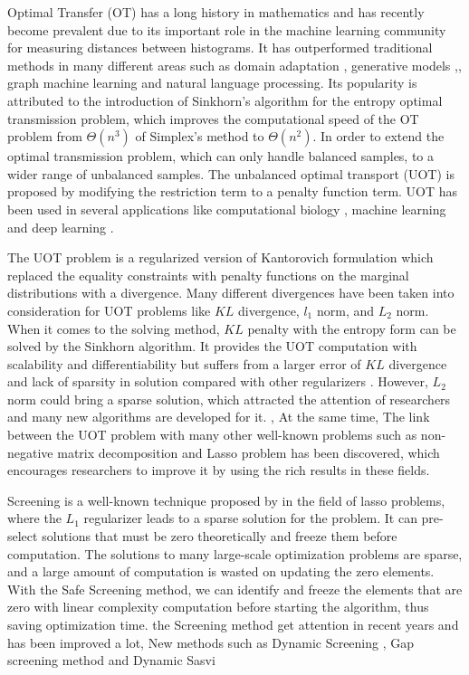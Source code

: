 Optimal Transfer (OT) has a long history in mathematics and has recently become prevalent due to its important role in the machine learning community for measuring distances between histograms. It has outperformed traditional methods in many different areas such as domain adaptation \citep{7586038}, generative models \citep{arjovsky2017wasserstein},, graph machine learning \citep{NEURIPS2019_fdd5b16f} and natural language processing. \citep{084adf2f555549c493e0331a00e4ecad} Its popularity is attributed to the introduction of Sinkhorn's algorithm for the entropy optimal transmission problem, \citep{NIPS2013_af21d0c9} which improves the computational speed of the OT problem from $\Theta (n^3)$ of Simplex's method to $\Theta (n^2)$. In order to extend the optimal transmission problem, which can only handle balanced samples, to a wider range of unbalanced samples. The unbalanced optimal transport (UOT) is proposed by modifying the restriction term to a penalty function term. UOT has been used in several applications like computational biology \citep{SCHIEBINGER2019928} , machine learning \citep{DBLP:conf/aistats/JanatiCG19} and deep learning \citep{DBLP:conf/iclr/YangU19}. 

The UOT problem is a regularized version of Kantorovich formulation which replaced the equality constraints with penalty functions on the marginal distributions with a divergence. Many different divergences have been taken into consideration for UOT problems like $KL$ divergence, $l_1$ norm, and $L_2$ norm. When it comes to the solving method, $KL$ penalty with the entropy form can be solved by the Sinkhorn algorithm. It provides the UOT computation with scalability and differentiability but suffers from a larger error of $KL$ divergence and lack of sparsity in solution compared with other regularizers \citep{DBLP:conf/aistats/BlondelSR18}. However, $L_2$ norm could bring a sparse solution, which attracted the attention of researchers and many new algorithms are developed for it. \citep{NEURIPS2021_c3c617a9}, \citep{https://doi.org/10.48550/arxiv.2202.03618} At the same time, The link between the UOT problem with many other well-known problems such as non-negative matrix decomposition and Lasso problem has been discovered, which encourages researchers to improve it by using the rich results in these fields.

Screening is a well-known technique proposed by \citep{ghaoui2010safe} in the field of lasso problems, where the $L_1$ regularizer leads to a sparse solution for the problem. It can pre-select solutions that must be zero theoretically and freeze them before computation. The solutions to many large-scale optimization problems are sparse, and a large amount of computation is wasted on updating the zero elements. With the Safe Screening method, we can identify and freeze the elements that are zero with linear complexity computation before starting the algorithm, thus saving optimization time. the Screening method get attention in recent years and has been improved a lot, New methods such as Dynamic Screening \citep{7128732}, Gap screening method \citep{JMLR:v18:16-577} and Dynamic Sasvi \citep{NEURIPS2021_7b5b23f4}  

